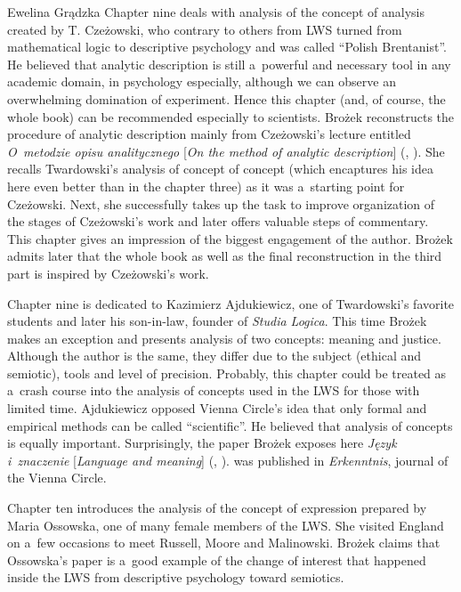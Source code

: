 \begin{newrevengenv}{Ewelina Grądzka}
Chapter nine deals with analysis of the concept of analysis created by T. Czeżowski, who contrary to others from LWS turned from mathematical logic to descriptive psychology and was called ``Polish Brentanist''. He believed that analytic description is still a~powerful and necessary tool in any academic domain, in psychology especially, although we can observe an overwhelming domination of experiment. Hence this chapter (and, of course, the whole book) can be recommended especially to scientists. Brożek reconstructs the procedure of analytic description mainly from Czeżowski's lecture entitled \textit{O~metodzie opisu analitycznego} [\textit{On the method of analytic description}]
(\cite[][]{czezowski_o_1958}, \cite*[Eng. transl.][]{czezowski_method_2000}). %
 She recalls Twardowski's analysis of concept of concept (which encaptures his idea here even better than in the chapter three) as it was a~starting point for Czeżowski. Next, she successfully takes up the task to improve organization of the stages of Czeżowski's work and later offers valuable steps of commentary. This chapter gives an impression of the biggest engagement of the author. Brożek admits later that the whole book as well as the final reconstruction in the third part is inspired by Czeżowski's work.

Chapter nine is dedicated to Kazimierz Ajdukiewicz, one of Twardowski's favorite students and later his son-in-law, founder of \textit{Studia Logica}. This time Brożek makes an exception and presents analysis of two concepts: meaning and justice. Although the author is the same, they differ due to the subject (ethical and semiotic), tools and level of precision. Probably, this chapter could be treated as a~crash course into the analysis of concepts used in the LWS for those with limited time. Ajdukiewicz opposed Vienna Circle's idea that only formal and empirical methods can be called ``scientific''. He believed that analysis of concepts is equally important. Surprisingly, the paper Brożek exposes here \textit{Język i~znaczenie} [\textit{Language and meaning}]
(\cite[][]{ajdukiewicz_jezyk_1960}, \cite*[Eng. transl.][]{giedymin_language_1978}). %
 was published in \textit{Erkenntnis}, journal of the Vienna Circle.

Chapter ten introduces the analysis of the concept of expression prepared by Maria Ossowska, one of many female members of the LWS. She visited England on a~few occasions to meet Russell, Moore and Malinowski. Brożek claims that Ossowska's paper is a~good example of the change of interest that happened inside the LWS from descriptive psychology toward semiotics.


\end{newrevengenv}
